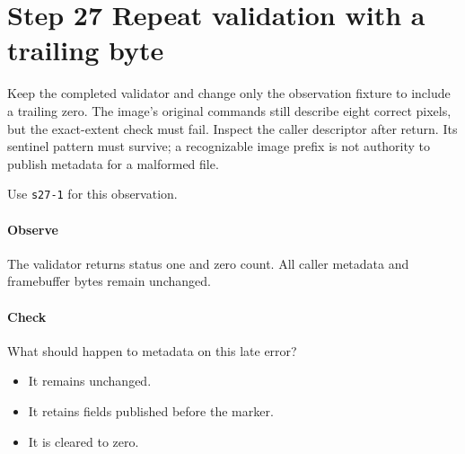 \section{Step 27 Repeat validation with a trailing byte}\label{qoi-s27}
Keep the completed validator and change only the observation fixture to include a trailing zero. The image’s original commands still describe eight correct pixels, but the exact-extent check must fail. Inspect the caller descriptor after return. Its sentinel pattern must survive; a recognizable image prefix is not authority to publish metadata for a malformed file.

Use \texttt{s27-1} for this observation.

\paragraph{Observe} The validator returns status one and zero count. All caller metadata and framebuffer bytes remain unchanged.

\paragraph{Check} What should happen to metadata on this late error?
\begin{itemize}
  \item[A.] It remains unchanged.
  \item[B.] It retains fields published before the marker.
  \item[C.] It is cleared to zero.
\end{itemize}
